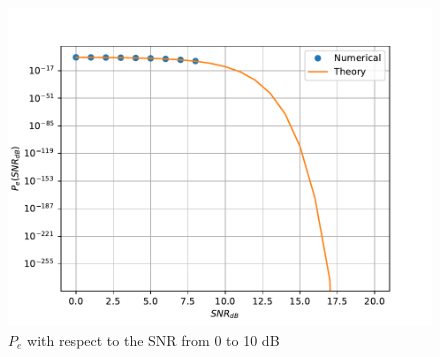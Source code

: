 \begin{enumerate}
\begin{figure}[H]
\centering
\includegraphics[scale=0.8]{chapter5/figs/biv_pe_vs_snr.pdf}
\caption{$P_e$ with respect to the SNR from 0 to 10 dB}
\label{fig:biv_pe_snr}
\end{figure}
%
\end{enumerate}
